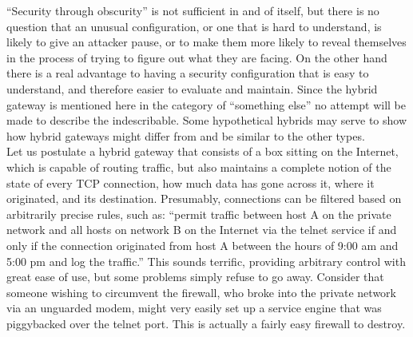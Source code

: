 \begin{htmllist}
    \label{hyb_gat}
    
    ``Security through obscurity'' is not sufficient in and of itself, but
    there is no question that an unusual configuration, or one that is hard
    to understand, is likely to give an attacker pause, or to make them
    more likely to reveal themselves in the process of trying to figure out
    what they are facing. On the other hand there is a real advantage to
    having a security configuration that is easy to understand, and
    therefore easier to evaluate and maintain. Since the hybrid gateway is
    mentioned here in the category of ``something else'' no attempt will be
    made to describe the indescribable. Some hypothetical hybrids may serve
    to show how hybrid gateways might differ from and be similar to the
    other types.\\
    
    Let us postulate a hybrid gateway that consists of a box sitting on the
    Internet, which is capable of routing traffic, but also maintains a
    complete notion of the state of every TCP connection, how much data has
    gone across it, where it originated, and its destination. Presumably,
    connections can be filtered based on arbitrarily precise rules, such
    as: ``permit traffic between host A on the private network and all
    hosts on network B on the Internet via the telnet service if and only
    if the connection originated from host A between the hours of 9:00 am
    and 5:00 pm and log the traffic.'' This sounds terrific, providing
    arbitrary control with great ease of use, but some problems simply
    refuse to go away. Consider that someone wishing to circumvent the
    firewall, who broke into the private network via an unguarded modem,
    might very easily set up a service engine that was piggybacked over the
    telnet port. This is actually a fairly easy firewall to destroy.\\
    

\end{htmllist}

